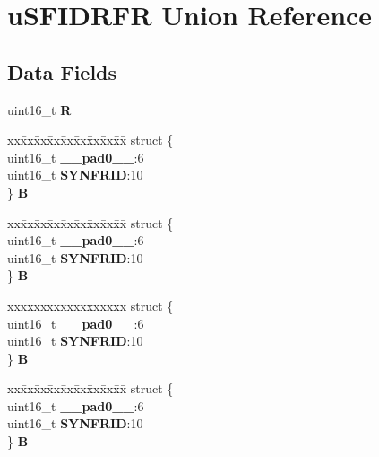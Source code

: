 \hypertarget{unionuSFIDRFR}{}\section{u\+S\+F\+I\+D\+R\+FR Union Reference}
\label{unionuSFIDRFR}
\subsection*{Data Fields}
\begin{DoxyCompactItemize}
\item 
\mbox{\label{unionuSFIDRFR_a1cc86e422469fea864c964074c6b5ac5}} 
uint16\+\_\+t {\bfseries R}
\item 
\mbox{\label{unionuSFIDRFR_a4693aac177a80ea8082415c2db4fbb14}} 
\begin{tabbing}
xx\=xx\=xx\=xx\=xx\=xx\=xx\=xx\=xx\=\kill
struct \{\\
\>uint16\_t {\bfseries \_\_pad0\_\_}:6\\
\>uint16\_t {\bfseries SYNFRID}:10\\
\} {\bfseries B}\\

\end{tabbing}\item 
\mbox{\label{unionuSFIDRFR_aeaa4cd63f9d1874f494216d502691e8f}} 
\begin{tabbing}
xx\=xx\=xx\=xx\=xx\=xx\=xx\=xx\=xx\=\kill
struct \{\\
\>uint16\_t {\bfseries \_\_pad0\_\_}:6\\
\>uint16\_t {\bfseries SYNFRID}:10\\
\} {\bfseries B}\\

\end{tabbing}\item 
\mbox{\label{unionuSFIDRFR_aeccc3074224b3ced9430afa0a25792cb}} 
\begin{tabbing}
xx\=xx\=xx\=xx\=xx\=xx\=xx\=xx\=xx\=\kill
struct \{\\
\>uint16\_t {\bfseries \_\_pad0\_\_}:6\\
\>uint16\_t {\bfseries SYNFRID}:10\\
\} {\bfseries B}\\

\end{tabbing}\item 
\mbox{\label{unionuSFIDRFR_aaeb489cd1beed14bfb3d3f7d065d5a60}} 
\begin{tabbing}
xx\=xx\=xx\=xx\=xx\=xx\=xx\=xx\=xx\=\kill
struct \{\\
\>uint16\_t {\bfseries \_\_pad0\_\_}:6\\
\>uint16\_t {\bfseries SYNFRID}:10\\
\} {\bfseries B}\\

\end{tabbing}\end{DoxyCompactItemize}


